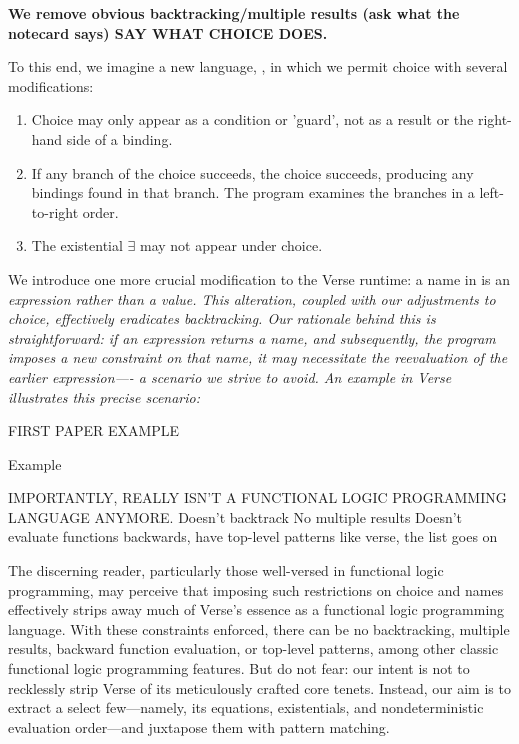 \documentclass[manuscript,screen,review, 12pt]{acmart}
\begin{document}
\begin{outline}[enumerate]
        \2 \bf{We remove obvious backtracking/multiple results (ask what the notecard says)}
        SAY WHAT CHOICE DOES. 

        To this end, we imagine a new language, \VMinus, in which we permit
        choice with several modifications:

        \begin{enumerate}
        \item Choice may only appear as a condition or 'guard', not as a result
        or the right-hand side of a binding.
        \item If any branch of the choice succeeds, the choice succeeds,
        producing any bindings found in that branch. The program examines the
        branches in a left-to-right order.
        \item The existential $\exists$ may not appear under choice.
        \end{enumerate}

        We introduce one more crucial modification to the Verse runtime: a name
        in \VMinus is an \it{expression} rather than a \it{value}. This
        alteration, coupled with our adjustments to choice, effectively
         eradicates backtracking. Our rationale
        behind this is straightforward: if an expression returns a name, and
        subsequently, the program imposes a new constraint on that name, it may
        necessitate the reevaluation of the earlier expression—- a scenario we
        strive to avoid. An example in Verse illustrates this precise scenario:

        FIRST PAPER EXAMPLE 

        \2 Example 

        \2 IMPORTANTLY, \VMinus REALLY ISN'T A FUNCTIONAL LOGIC PROGRAMMING LANGUAGE ANYMORE. 
        \3 Doesn't backtrack
        \3 No multiple results 
        \3 Doesn't evaluate functions backwards, have top-level patterns like verse, the list goes on 


        The discerning reader, particularly those well-versed in functional
        logic programming, may perceive that imposing such restrictions on
        choice and names effectively strips away much of Verse's essence as a
        functional logic programming language. With these constraints enforced,
        there can be no backtracking, multiple results, backward function
        evaluation, or top-level patterns, among other classic functional logic
        programming features. But do not fear: our intent is not to recklessly
        strip Verse of its meticulously crafted core tenets. Instead, our aim is
        to extract a select few—namely, its equations, existentials, and
        nondeterministic evaluation order—and juxtapose them with pattern
        matching.


\end{outline}
\end{document}
